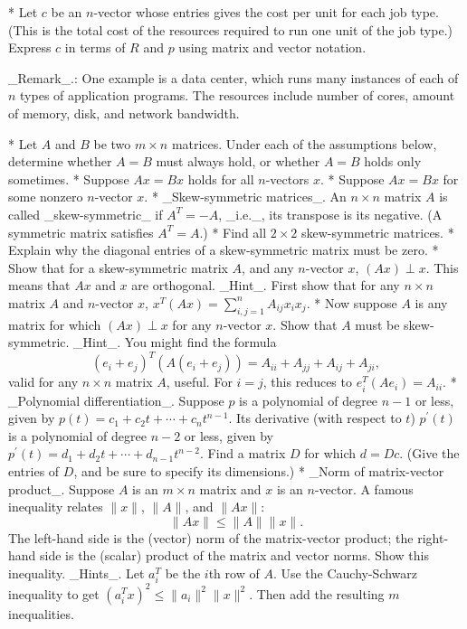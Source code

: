 * Let \(c\) be an \(n\)-vector whose entries gives the cost per unit for each job type. (This is the total cost of the resources required to run one unit of the job type.) Express \(c\) in terms of \(R\) and \(p\) using matrix and vector notation.

_Remark_.: One example is a data center, which runs many instances of each of \(n\) types of application programs. The resources include number of cores, amount of memory, disk, and network bandwidth.

* Let \(A\) and \(B\) be two \(m\times n\) matrices. Under each of the assumptions below, determine whether \(A=B\) must always hold, or whether \(A=B\) holds only sometimes.
* Suppose \(Ax=Bx\) holds for all \(n\)-vectors \(x\).
* Suppose \(Ax=Bx\) for some nonzero \(n\)-vector \(x\).
* _Skew-symmetric matrices_. An \(n\times n\) matrix \(A\) is called _skew-symmetric_ if \(A^{T}=-A\), _i.e._, its transpose is its negative. (A symmetric matrix satisfies \(A^{T}=A\).)
* Find all \(2\times 2\) skew-symmetric matrices.
* Explain why the diagonal entries of a skew-symmetric matrix must be zero.
* Show that for a skew-symmetric matrix \(A\), and any \(n\)-vector \(x\), \((Ax)\perp x\). This means that \(Ax\) and \(x\) are orthogonal. _Hint_. First show that for any \(n\times n\) matrix \(A\) and \(n\)-vector \(x\), \(x^{T}(Ax)=\sum_{i,j=1}^{n}A_{ij}x_{i}x_{j}\).
* Now suppose \(A\) is any matrix for which \((Ax)\perp x\) for any \(n\)-vector \(x\). Show that \(A\) must be skew-symmetric. _Hint_. You might find the formula \[(e_{i}+e_{j})^{T}(A(e_{i}+e_{j}))=A_{ii}+A_{jj}+A_{ij}+A_{ji},\] valid for any \(n\times n\) matrix \(A\), useful. For \(i=j\), this reduces to \(e_{i}^{T}(Ae_{i})=A_{ii}\).
* _Polynomial differentiation_. Suppose \(p\) is a polynomial of degree \(n-1\) or less, given by \(p(t)=c_{1}+c_{2}t+\cdots+c_{n}t^{n-1}\). Its derivative (with respect to \(t\)) \(p^{\prime}(t)\) is a polynomial of degree \(n-2\) or less, given by \(p^{\prime}(t)=d_{1}+d_{2}t+\cdots+d_{n-1}t^{n-2}\). Find a matrix \(D\) for which \(d=Dc\). (Give the entries of \(D\), and be sure to specify its dimensions.)
* _Norm of matrix-vector product_. Suppose \(A\) is an \(m\times n\) matrix and \(x\) is an \(n\)-vector. A famous inequality relates \(\|x\|\), \(\|A\|\), and \(\|Ax\|\): \[\|Ax\|\leq\|A\|\|x\|.\] The left-hand side is the (vector) norm of the matrix-vector product; the right-hand side is the (scalar) product of the matrix and vector norms. Show this inequality. _Hints_. Let \(a_{i}^{T}\) be the \(i\)th row of \(A\). Use the Cauchy-Schwarz inequality to get \((a_{i}^{T}x)^{2}\leq\|a_{i}\|^{2}\|x\|^{2}\). Then add the resulting \(m\) inequalities.
